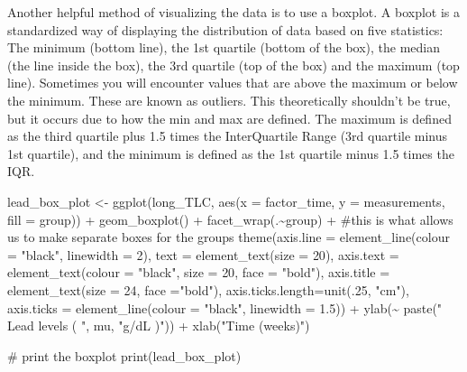 \documentclass[
  letterpaper,
  DIV=11,
  numbers=noendperiod]{scrreprt}
\newenvironment{Shaded}{\begin{snugshade}}{\end{snugshade}}
\newcommand{\AttributeTok}[1]{\textcolor[rgb]{0.40,0.45,0.13}{#1}}
\newcommand{\CommentTok}[1]{\textcolor[rgb]{0.37,0.37,0.37}{#1}}
\newcommand{\DecValTok}[1]{\textcolor[rgb]{0.68,0.00,0.00}{#1}}
\newcommand{\FloatTok}[1]{\textcolor[rgb]{0.68,0.00,0.00}{#1}}
\newcommand{\FunctionTok}[1]{\textcolor[rgb]{0.28,0.35,0.67}{#1}}
\newcommand{\NormalTok}[1]{\textcolor[rgb]{0.00,0.23,0.31}{#1}}
\newcommand{\OtherTok}[1]{\textcolor[rgb]{0.00,0.23,0.31}{#1}}
\newcommand{\SpecialCharTok}[1]{\textcolor[rgb]{0.37,0.37,0.37}{#1}}
\newcommand{\StringTok}[1]{\textcolor[rgb]{0.13,0.47,0.30}{#1}}
\begin{document}
Another helpful method of visualizing the data is to use a boxplot. A
boxplot is a standardized way of displaying the distribution of data
based on five statistics: The minimum (bottom line), the 1st quartile
(bottom of the box), the median (the line inside the box), the 3rd
quartile (top of the box) and the maximum (top line). Sometimes you will
encounter values that are above the maximum or below the minimum. These
are known as outliers. This theoretically shouldn't be true, but it
occurs due to how the min and max are defined. The maximum is defined as
the third quartile plus 1.5 times the InterQuartile Range (3rd quartile
minus 1st quartile), and the minimum is defined as the 1st quartile
minus 1.5 times the IQR.

\begin{Shaded}
\begin{Highlighting}[]
\NormalTok{lead\_box\_plot }\OtherTok{\textless{}{-}} \FunctionTok{ggplot}\NormalTok{(long\_TLC, }\FunctionTok{aes}\NormalTok{(}\AttributeTok{x =}\NormalTok{ factor\_time, }\AttributeTok{y =}\NormalTok{ measurements, }\AttributeTok{fill =}\NormalTok{ group)) }\SpecialCharTok{+}
  \FunctionTok{geom\_boxplot}\NormalTok{() }\SpecialCharTok{+}
  \FunctionTok{facet\_wrap}\NormalTok{(.}\SpecialCharTok{\textasciitilde{}}\NormalTok{group) }\SpecialCharTok{+} \CommentTok{\#this is what allows us to make separate boxes for the groups}
  \FunctionTok{theme}\NormalTok{(}\AttributeTok{axis.line =} \FunctionTok{element\_line}\NormalTok{(}\AttributeTok{colour =} \StringTok{"black"}\NormalTok{, }\AttributeTok{linewidth =} \DecValTok{2}\NormalTok{),}
        \AttributeTok{text =} \FunctionTok{element\_text}\NormalTok{(}\AttributeTok{size =} \DecValTok{20}\NormalTok{),}
        \AttributeTok{axis.text =} \FunctionTok{element\_text}\NormalTok{(}\AttributeTok{colour =} \StringTok{"black"}\NormalTok{, }\AttributeTok{size =} \DecValTok{20}\NormalTok{, }\AttributeTok{face =} \StringTok{"bold"}\NormalTok{),}
        \AttributeTok{axis.title =} \FunctionTok{element\_text}\NormalTok{(}\AttributeTok{size =} \DecValTok{24}\NormalTok{, }\AttributeTok{face =}\StringTok{"bold"}\NormalTok{),}
        \AttributeTok{axis.ticks.length=}\FunctionTok{unit}\NormalTok{(.}\DecValTok{25}\NormalTok{, }\StringTok{"cm"}\NormalTok{),}
        \AttributeTok{axis.ticks =} \FunctionTok{element\_line}\NormalTok{(}\AttributeTok{colour =} \StringTok{"black"}\NormalTok{, }\AttributeTok{linewidth =} \FloatTok{1.5}\NormalTok{)) }\SpecialCharTok{+}
  \FunctionTok{ylab}\NormalTok{(}\SpecialCharTok{\textasciitilde{}} \FunctionTok{paste}\NormalTok{(}\StringTok{" Lead levels ( "}\NormalTok{, mu, }\StringTok{"g/dL )"}\NormalTok{)) }\SpecialCharTok{+}
  \FunctionTok{xlab}\NormalTok{(}\StringTok{"Time (weeks)"}\NormalTok{)}

\CommentTok{\# print the boxplot}
\FunctionTok{print}\NormalTok{(lead\_box\_plot)}
\end{Highlighting}
\end{Shaded}
\end{document}
